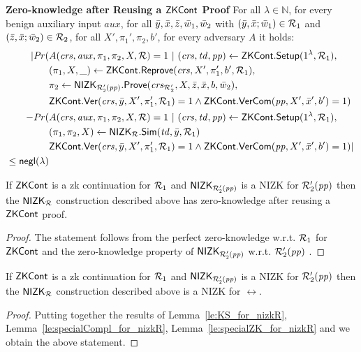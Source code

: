\noindent \textbf{Zero-knowledge after Reusing a ${\mathsf{ZKCont}}$ Proof} For all $\lambda \in \mathbb{N}$, for every benign auxiliary input $aux$, 
for all $\bar{y},\bar{x},\bar{z}, \bar{w}_1, \bar{w}_2$ with $(\bar{y}, \bar{x}; \bar{w}_1) \in \mathcal{R}_1$ and $(\bar{z}, \bar{x}; \bar{w}_2) \in \mathcal{R}_2$, for all $X',\pi_1',\pi_2, b'$, for every adversary $A$ it holds:
\begin{align*}
| \mathit{Pr}(& A(\mathit{crs}, \mathit{aux}, \pi_1,\pi_2, X, \mathcal{R}) = 1 \ | \ (\mathit{crs}, \mathit{td}, \mathit{pp}) \leftarrow {\ensuremath{\mathsf{ZKCont}}}.{\mathsf{Setup}} (1^{\lambda}, \mathcal{R}_1), \\
                  &(\pi_1, X, \_) \leftarrow {\ensuremath{\mathsf{ZKCont}}}.{\mathsf{Reprove}} (\mathit{crs}, X', \pi_1', b', \mathcal{R}_1), \\
                  & \pi_2 \leftarrow {\ensuremath{\mathsf{NIZK_{\mathcal{R}'_2(\mathit{pp})}}}}.{\mathsf{Prove}}(\mathit{crs}_{\mathcal{R}'_2}, X, \bar{z}, \bar{x}, b, \bar{w}_2), \\
                  &  {\mathsf{ZKCont}}.{\mathsf{Ver}}(\mathit{crs}, \bar{y}, X', \pi'_1, \mathcal{R}_1) = 1 
                  \wedge {\ensuremath{\mathsf{ZKCont}}}.{\mathsf{VerCom}}(\mathit{pp}, X', \bar{x}', b') = 1)   \\
- \mathit{Pr}(& A(\mathit{crs}, \mathit{aux}, \pi_1,\pi_2, X, \mathcal{R}) = 1 \ | \ (\mathit{crs}, \mathit{td}, \mathit{pp}) \leftarrow {\ensuremath{\mathsf{ZKCont}}}.{\mathsf{Setup}} (1^{\lambda}, \mathcal{R}_1), \\ 
                     & (\pi_1,\pi_2, X) \leftarrow {\ensuremath{\mathsf{NIZK_{\mathcal{R}}}}}.{\mathsf{Sim}}(\mathit{td}, \bar{y}, \mathcal{R}_1) \\ 
                     &  {\mathsf{ZKCont}}.{\mathsf{Ver}}(\mathit{crs}, \bar{y}, X', \pi'_1, \mathcal{R}_1) = 1 \wedge {\ensuremath{\mathsf{ZKCont}}}.{\mathsf{VerCom}}(\mathit{pp}, X', \bar{x}', b') = 1) | \\
                    \leq \mathsf{negl}(\lambda)
\end{align*}

\begin{lemma} 
\label{le:specialZK_for_nizkR}
If ${\mathsf{ZKCont}}$ is a zk continuation for $\mathcal{R}_1$ and ${\mathsf{NIZK_{\mathcal{R}'_2(\mathit{pp})}}}$ is a NIZK for $\mathcal{R}_2'(\mathit{pp})$ 
then the ${\mathsf{NIZK_{\mathcal{R}}}}$ construction described above has zero-knowledge after reusing a ${\mathsf{ZKCont}}$ proof.
\end{lemma} 
\begin{proof} The statement follows from the perfect zero-knowledge w.r.t. $\mathcal{R}_1$ for ${\mathsf{ZKCont}}$ and 
the zero-knowledge property of ${\mathsf{NIZK_{\mathcal{R}'_2(\mathit{pp})}}}$ w.r.t. $\mathcal{R}_2'(\mathit{pp})$ .
\end{proof}
 
\begin{corollary}
If ${\mathsf{ZKCont}}$ is a zk continuation for $\mathcal{R}_1$ and ${\mathsf{NIZK_{\mathcal{R}'_2(\mathit{pp})}}}$ is a NIZK for $\mathcal{R}_2'(\mathit{pp})$ 
then the ${\mathsf{NIZK_{\mathcal{R}}}}$ construction described above is a NIZK for $\rel$.
 \end{corollary}
 
\begin{proof} Putting together the results of Lemma~\ref{le:KS_for_nizkR}, Lemma~\ref{le:specialCompl_for_nizkR}, 
Lemma~\ref{le:specialZK_for_nizkR} and  we obtain the above statement.
\end{proof} 
